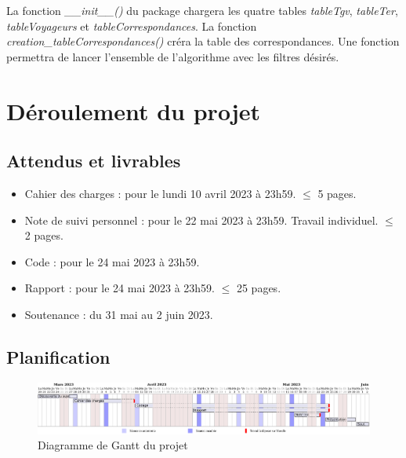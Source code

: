 \documentclass[
]{article}
\begin{document}
La fonction \emph{\_\_init\_\_()} du package chargera les quatre tables \emph{tableTgv}, \emph{tableTer}, \emph{tableVoyageurs} et \emph{tableCorrespondances}.
La fonction \emph{creation\_tableCorrespondances()} créra la table des correspondances.
Une fonction permettra de lancer l'ensemble de l'algorithme avec les filtres désirés.

\hypertarget{duxe9roulement-du-projet}{%
\section{Déroulement du projet}\label{duxe9roulement-du-projet}}

\hypertarget{attendus-et-livrables}{%
\subsection{Attendus et livrables}\label{attendus-et-livrables}}

\begin{itemize}
\item
  Cahier des charges : pour le lundi 10 avril 2023 à 23h59. \(\le\) 5 pages.
\item
  Note de suivi personnel : pour le 22 mai 2023 à 23h59. Travail individuel. \(\le\) 2 pages.
\item
  Code : pour le 24 mai 2023 à 23h59.
\item
  Rapport : pour le 24 mai 2023 à 23h59. \(\le\) 25 pages.
\item
  Soutenance : du 31 mai au 2 juin 2023.
\end{itemize}

\hypertarget{planification}{%
\subsection{Planification}\label{planification}}

\begin{figure}
\centering
\includegraphics{gantt.pdf}
\caption{Diagramme de Gantt du projet}
\end{figure}
\end{document}
